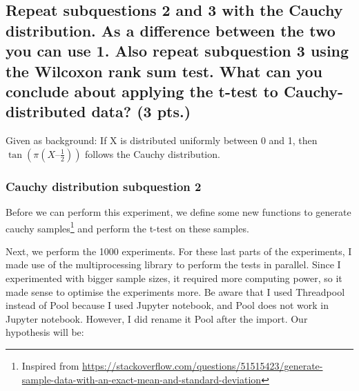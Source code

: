 \documentclass[a4paper]{article}
\begin{document}
\subsection{Repeat subquestions 2 and 3 with the Cauchy distribution. As a difference between the two you can use 1. Also repeat subquestion 3 using the Wilcoxon rank sum test. What can you conclude about applying the t-test to Cauchy-distributed data? (3 pts.)}
Given as background: If X is distributed uniformly between 0 and 1, then  $ \tan(\pi (X – \frac{1}{2}))$ follows the Cauchy distribution.\newline\newline
\subsubsection{Cauchy distribution subquestion 2}
Before we can perform this experiment, we define some new functions to generate cauchy samples\footnote{Inspired from \url{https://stackoverflow.com/questions/51515423/generate-sample-data-with-an-exact-mean-and-standard-deviation}} and perform the t-test on these samples.
Next, we perform the 1000 experiments. For these last parts of the experiments, I made use of the multiprocessing library to perform the tests in parallel. Since I experimented with bigger sample sizes, it required more computing power, so it made sense to optimise the experiments more. Be aware that I used Threadpool instead of Pool because I used Jupyter notebook, and Pool does not work in Jupyter notebook. However, I did rename it Pool after the import. Our hypothesis will be: \newline\newline
\end{document}
